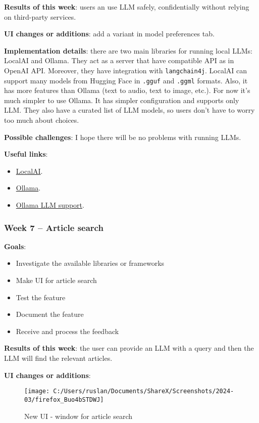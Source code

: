 \documentclass{article}
\begin{document}
	\textbf{Results of this week}: users an use LLM safely, confidentially without relying on third-party services.
	
	\textbf{UI changes or additions}: add a variant in model preferences tab.
	
	\textbf{Implementation details}: there are two main libraries for running local LLMs: LocalAI and Ollama. They act as a server that have compatible API as in OpenAI API. Moreover, they have integration with \texttt{langchain4j}. LocalAI can support many models from Hugging Face in \texttt{.gguf} and \texttt{.ggml} formats. Also, it has more features than Ollama (text to audio, text to image, etc.). For now it's much simpler to use Ollama. It has simpler configuration and supports only LLM. They also have a curated list of LLM models, so users don't have to worry too much about choices.
	
	\textbf{Possible challenges}: I hope there will be no problems with running LLMs.
	
	\textbf{Useful links}:
	\begin{itemize}
		\item \href{https://localai.io/}{LocalAI}.
		\item \href{https://ollama.com/}{Ollama}.
		\item \href{https://ollama.com/library}{Ollama LLM support}.
	\end{itemize}
	
	\subsubsection{Week 7 -- Article search}
	\textbf{Goals}:
	\begin{itemize}
		\item Investigate the available libraries or frameworks
		\item Make UI for article search
		\item Test the feature
		\item Document the feature
		\item Receive and process the feedback
	\end{itemize}
	
	\textbf{Results of this week}: the user can provide an LLM with a query and then the LLM will find the relevant articles.
	
	\textbf{UI changes or additions}:
	
	\begin{figure}[H]
		\centering
		\texttt{[image: C:/Users/ruslan/Documents/ShareX/Screenshots/2024-03/firefox\_Buo4bSTDWJ]}
		\caption{New UI - window for article search}
		\label{fig:firefoxbuo4bstdwj}
	\end{figure}
	
\end{document}
